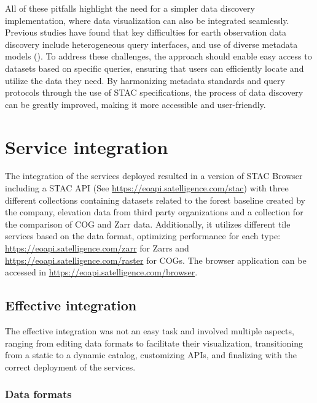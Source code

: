 \documentclass[
  oneside,
  open=any]{scrbook}
\begin{document}
All of these pitfalls highlight the need for a simpler data discovery
implementation, where data visualization can also be integrated
seamlessly. Previous studies have found that key difficulties for earth
observation data discovery include heterogeneous query interfaces, and
use of diverse metadata models
(). To address these challenges, the approach should enable easy
access to datasets based on specific queries, ensuring that users can
efficiently locate and utilize the data they need. By harmonizing
metadata standards and query protocols through the use of STAC
specifications, the process of data discovery can be greatly improved,
making it more accessible and user-friendly.

\section{Service integration}\label{service-integration}

The integration of the services deployed resulted in a version of STAC
Browser including a STAC API (See
\href{https://eoapi.satelligence.com/stac/}{https://eoapi.satelligence.com/stac})
with three different collections containing datasets related to the
forest baseline created by the company, elevation data from third party
organizations and a collection for the comparison of COG and Zarr data.
Additionally, it utilizes different tile services based on the data
format, optimizing performance for each type:
\url{https://eoapi.satelligence.com/zarr} for Zarrs and
\url{https://eoapi.satelligence.com/raster} for COGs. The browser
application can be accessed in
\href{https://eoapi.satelligence.com/browser/?.language=en}{https://eoapi.satelligence.com/browser}.

\subsection{Effective integration}\label{effective-integration}

The effective integration was not an easy task and involved multiple
aspects, ranging from editing data formats to facilitate their
visualization, transitioning from a static to a dynamic catalog,
customizing APIs, and finalizing with the correct deployment of the
services.

\subsubsection*{Data formats}\label{data-formats}
\end{document}

